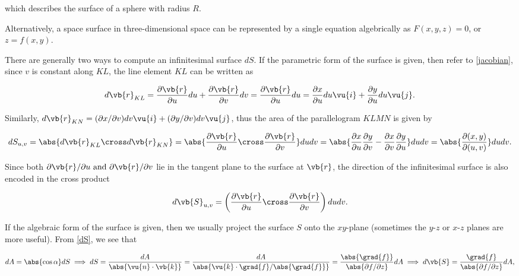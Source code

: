 \documentclass[english,a4paper,12pt]{report}
\begin{document}
which describes the surface of a sphere with radius \(R\).

Alternatively, a space surface in three-dimensional space can be represented by a single equation algebrically as \(F(x,y,z) = 0\), or \(z = f(x,y)\).  

There are generally two ways to compute an infinitesimal surface \(dS\). If the parametric form of the surface is given, then refer to \cref{jacobian}, since \(v\) is constant along \(KL\), the line element \(KL\) can be written as 

\begin{equation}
	d\vb{r} _{KL} = \frac{\partial \vb{r} }{\partial u}du+ \frac{\partial \vb{r} }{\partial v}dv = \frac{\partial \vb{r} }{\partial u}du = \frac{\partial x}{\partial u} du \vu{i} + \frac{\partial y}{\partial u} du \vu{j}.
\end{equation}

Similarly, \(d\vb{r} _{KN}  = (\partial x / \partial v) dv \vu{i} + (\partial y/\partial v)dv \vu{j}\), thus the area of the parallelogram \(KLMN\) is given by

\begin{equation}
	dS_{u,v} = \abs{d\vb{r} _{KL} \cross  d\vb{r} _{KN}} = \abs{\frac{\partial \vb{r} }{\partial u} \cross \frac{\partial \vb{r} }{\partial v} }dudv = \abs{\frac{\partial x}{\partial u} \frac{\partial y}{\partial v}  - \frac{\partial x}{\partial v}  \frac{\partial y}{\partial u} }dudv = \abs{\frac{\partial (x,y)}{\partial (u,v)} } dudv.
\end{equation}

Since both \(\partial \vb{r} /\partial u \text { and } \partial \vb{r} /\partial v  \) lie in the tangent plane to the surface at \(\vb{r} \), the direction of the infinitesimal surface is also encoded in the cross product

\begin{equation}
	d\vb{S} _{u,v} =\left( \frac{\partial \vb{r} }{\partial u} \cross \frac{\partial \vb{r} }{\partial v} \right) dudv.   
\end{equation}



If the algebraic form of the surface is given, then we usually project the surface \(S\) onto the \(xy\)-plane (sometimes the \(y\)-\(z\) or \(x\)-\(z\) planes are more useful). From \cref{dS}, we see that 

\begin{equation} \label{dseq} 
	dA = \abs{\cos \alpha }dS \implies dS = \frac{dA}{\abs{\vu{n} \cdot \vb{k} } } = \frac{dA}{\abs{\vu{k} \cdot \grad{f} / \abs{\grad{f} }  } } =  \frac{\abs{\grad{f} } }{\abs{\partial f / \partial z} }dA \implies d\vb{S} = \frac{\grad{f}}{\abs{\partial f / \partial z} } dA, 
\end{equation}
\end{document}
